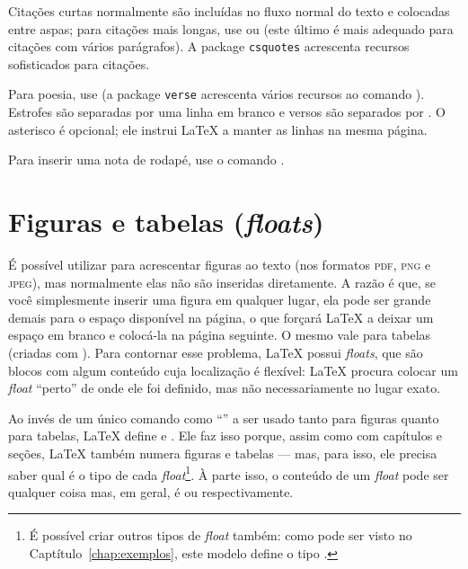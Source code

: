 Citações curtas normalmente são incluídas no fluxo normal do texto e colocadas
entre aspas; para citações mais longas, use  ou
 (este último é mais adequado para citações com
vários parágrafos). A package \texttt{csquotes} acrescenta recursos sofisticados
para citações.

Para poesia, use  (a package \texttt{verse} acrescenta
vários recursos ao comando ). Estrofes são separadas por uma linha
em branco e versos são separados por \cmd{\sla\sla{}*}. O asterisco é opcional;
ele instrui \LaTeX{} a manter as linhas na mesma página.

Para inserir uma nota de rodapé, use o comando .

\section{Figuras e tabelas (\emph{floats})}
\label{sec:floats}

\enlargethispage{.5\baselineskip}

É possível utilizar  para acrescentar figuras
ao texto (nos formatos \textsc{pdf}, \textsc{png} e \textsc{jpeg}),
mas normalmente elas não são inseridas diretamente. A razão é que, se
você simplesmente inserir uma figura em qualquer lugar, ela pode
ser grande demais para o espaço disponível na página, o que forçará
\LaTeX{} a deixar um espaço em branco e colocá-la na página seguinte.
O mesmo vale para tabelas (criadas com ).
Para contornar esse problema, \LaTeX{} possui \emph{floats}, que
são blocos com algum conteúdo cuja localização é flexível: \LaTeX{}
procura colocar um \emph{float} ``perto'' de onde ele foi definido,
mas não necessariamente no lugar exato.

Ao invés de um único comando como ``'' a
ser usado tanto para figuras quanto para tabelas, \LaTeX{} define
 e . Ele faz isso
porque, assim como com capítulos e seções, \LaTeX{} também numera
figuras e tabelas --- mas, para isso, ele precisa saber qual é o tipo de
cada \emph{float}\footnote{É possível criar outros tipos de \emph{float}
também: como pode ser visto no Captítulo~\ref{chap:exemplos}, este
modelo define o tipo .}. À parte isso, o conteúdo de
um \emph{float} pode ser qualquer coisa mas, em geral, é
 ou  respectivamente.

